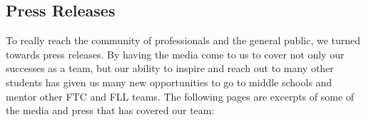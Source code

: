 \subsection{Press Releases}
To really reach the community of professionals and the general public, we turned towards press releases. By having the media come to us to cover not only our successes as a team, but our ability to inspire and reach out to many other students has given us many new opportunities to go to middle schools and mentor other FTC and FLL teams. The following pages are excerpts of some of the media and press that has covered our team:



